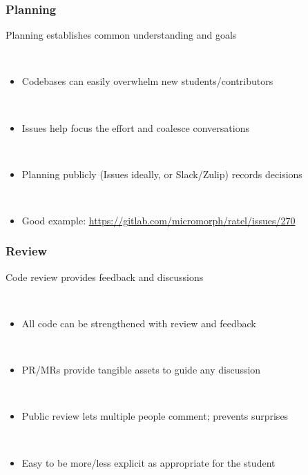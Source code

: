 \documentclass{beamer}
\begin{document}
\begin{frame}
\begin{center}
\frametitle{Planning}

Planning establishes common understanding and goals

~\\

\begin{itemize}

\item Codebases can easily overwhelm new students/contributors

~\\

\item Issues help focus the effort and coalesce conversations

~\\

\item Planning publicly (Issues ideally, or Slack/Zulip) records decisions

~\\

\item Good example: \href{https://gitlab.com/micromorph/ratel/issues/270}{https://gitlab.com/micromorph/ratel/issues/270}\\

\end{itemize}

\end{center}
\end{frame}


\begin{frame}
\begin{center}
\frametitle{Review}

Code review provides feedback and discussions

~\\

\begin{itemize}

\item All code can be strengthened with review and feedback

~\\

\item PR/MRs provide tangible assets to guide any discussion

~\\

\item Public review lets multiple people comment; prevents surprises

~\\

\item Easy to be more/less explicit as appropriate for the student

\end{itemize}

\end{center}
\end{frame}
\end{document}
